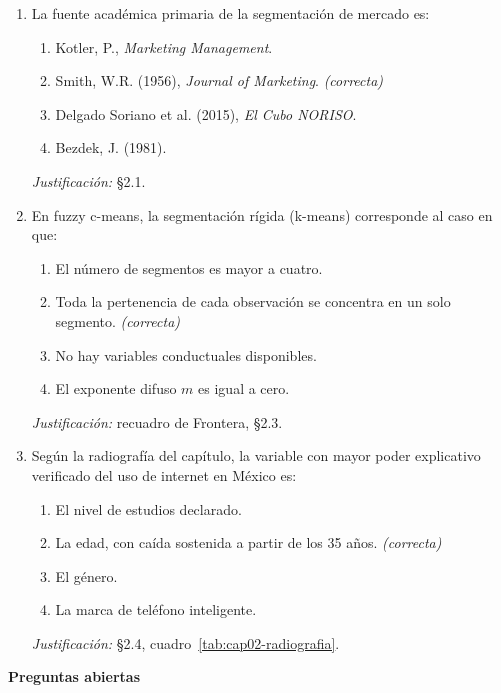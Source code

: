 \begin{enumerate}
  \item La fuente académica primaria de la segmentación de mercado es:
  \begin{enumerate}
    \item[a)] Kotler, P., \textit{Marketing Management}.
    \item[b)] Smith, W.R. (1956), \textit{Journal of Marketing}. \textit{(correcta)}
    \item[c)] Delgado Soriano et al. (2015), \textit{El Cubo NORISO}.
    \item[d)] Bezdek, J. (1981).
  \end{enumerate}
  \textit{Justificación:} §2.1.

  \item En fuzzy c-means, la segmentación rígida (k-means) corresponde al
  caso en que:
  \begin{enumerate}
    \item[a)] El número de segmentos es mayor a cuatro.
    \item[b)] Toda la pertenencia de cada observación se concentra en un solo segmento. \textit{(correcta)}
    \item[c)] No hay variables conductuales disponibles.
    \item[d)] El exponente difuso $m$ es igual a cero.
  \end{enumerate}
  \textit{Justificación:} recuadro de Frontera, §2.3.

  \item Según la radiografía del capítulo, la variable con mayor poder
  explicativo verificado del uso de internet en México es:
  \begin{enumerate}
    \item[a)] El nivel de estudios declarado.
    \item[b)] La edad, con caída sostenida a partir de los 35 años. \textit{(correcta)}
    \item[c)] El género.
    \item[d)] La marca de teléfono inteligente.
  \end{enumerate}
  \textit{Justificación:} §2.4, cuadro~\ref{tab:cap02-radiografia}.
\end{enumerate}

\textbf{Preguntas abiertas}

